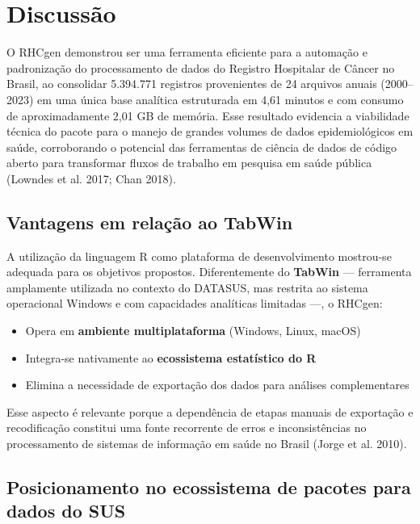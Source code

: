 \documentclass[
  brazilian,
  a4paper,
  oneside]{scrbook}
\providecommand{\tightlist}{%
  \setlength{\itemsep}{0pt}\setlength{\parskip}{0pt}}
\begin{document}

\chapter{Discussão}\label{discussuxe3o}

O RHCgen demonstrou ser uma ferramenta eficiente para a automação e
padronização do processamento de dados do Registro Hospitalar de Câncer
no Brasil, ao consolidar 5.394.771 registros provenientes de 24 arquivos
anuais (2000--2023) em uma única base analítica estruturada em 4,61
minutos e com consumo de aproximadamente 2,01 GB de memória. Esse
resultado evidencia a viabilidade técnica do pacote para o manejo de
grandes volumes de dados epidemiológicos em saúde, corroborando o
potencial das ferramentas de ciência de dados de código aberto para
transformar fluxos de trabalho em pesquisa em saúde pública ({Lowndes et
al.} 2017; Chan 2018).

\section{Vantagens em relação ao
TabWin}\label{vantagens-em-relauxe7uxe3o-ao-tabwin}

A utilização da linguagem R como plataforma de desenvolvimento
mostrou-se adequada para os objetivos propostos. Diferentemente do
\textbf{TabWin} --- ferramenta amplamente utilizada no contexto do
DATASUS, mas restrita ao sistema operacional Windows e com capacidades
analíticas limitadas ---, o RHCgen:

\begin{itemize}
\tightlist
\item
  Opera em \textbf{ambiente multiplataforma} (Windows, Linux, macOS)
\item
  Integra-se nativamente ao \textbf{ecossistema estatístico do R}
\item
  Elimina a necessidade de exportação dos dados para análises
  complementares
\end{itemize}

Esse aspecto é relevante porque a dependência de etapas manuais de
exportação e recodificação constitui uma fonte recorrente de erros e
inconsistências no processamento de sistemas de informação em saúde no
Brasil (Jorge et al. 2010).

\section{Posicionamento no ecossistema de pacotes para dados do
SUS}\label{posicionamento-no-ecossistema-de-pacotes-para-dados-do-sus}
\end{document}
